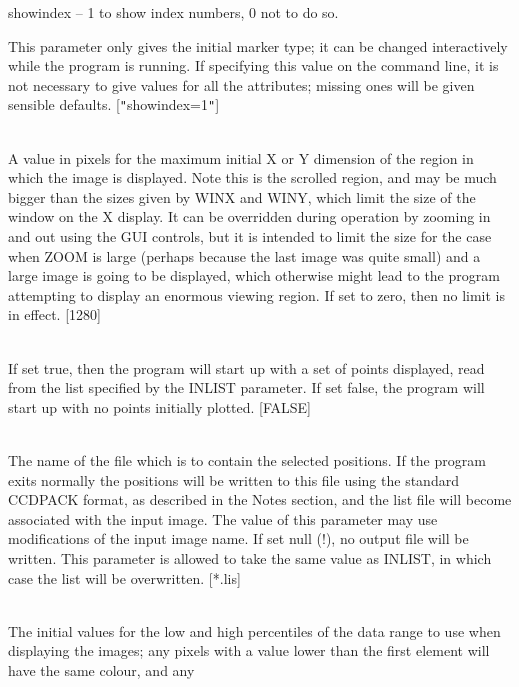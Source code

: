 \documentclass[twoside,11pt]{article}
\renewcommand{\_}{\texttt{\symbol{95}}}
\newcommand{\qt}[1]{{\tt "}#1{\tt "}}
\newcommand{\sstsubsection}[1]{ \item[{#1}] \mbox{} \\}
\newcommand{\sstitem}{\item}
\newcommand{\sstsubsection}[1]{\item[{#1}]}
\newcommand{\sstitem}{\item}
\begin{document}
{{{{            \sstitem
              showindex  -- 1 to show index numbers, 0 not to do so.
         }
         This parameter only gives the initial marker type; it can be
         changed interactively while the program is running.
         If specifying this value on the command line, it is not 
         necessary to give values for all the attributes; missing ones
         will be given sensible defaults.
         [\qt{showindex=1}]
      }
      \sstsubsection{
         MAXCANV = \_INTEGER (Read and Write)
      }{
         A value in pixels for the maximum initial X or Y dimension of
         the region in which the image is displayed.  Note this is the 
         scrolled region, and may be much bigger than the sizes given
         by WINX and WINY, which limit the size of the window on the
         X display.  It can be overridden during operation by zooming
         in and out using the GUI controls, but it is intended to 
         limit the size for the case when ZOOM is large (perhaps
         because the last image was quite small) and a large image
         is going to be displayed, which otherwise might lead to 
         the program attempting to display an enormous viewing region.
         If set to zero, then no limit is in effect.
         [1280]
      }
      \sstsubsection{
         READLIST = \_LOGICAL (Read)
      }{
         If set true, then the program will start up with a set of points
         displayed, read from the list specified by the INLIST parameter.
         If set false, the program will start up with no points initially
         plotted.
         [FALSE]
      }
      \sstsubsection{
         OUTLIST = FILENAME (Write)
      }{
         The name of the file which is to contain the selected
         positions.  If the program exits normally the positions will
         be written to this file using the standard CCDPACK format,
         as described in the Notes section, and the list file will 
         become associated with the input image.  The value of this 
         parameter may use modifications of the input image name.
         If set null (!), no output file will be written.  This
         parameter is allowed to take the same value as INLIST, in
         which case the list will be overwritten.
         [*.lis]
      }
      \sstsubsection{
         PERCENTILES( 2 ) = \_DOUBLE (Read and Write)
      }{
         The initial values for the low and high percentiles of the data 
         range to use when displaying the images; any pixels with a value
         lower than the first element will have the same colour, and any 
}}}
\end{document}
